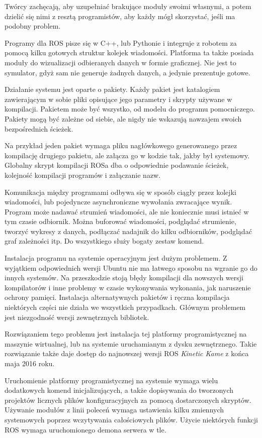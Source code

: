 Twórcy zachęcają, aby uzupełniać brakujące moduły swoimi własnymi, a potem dzielić się nimi z resztą programistów, aby każdy mógł skorzystać, jeśli ma podobny problem.

Programy dla ROS pisze się w C++, lub Pythonie i integruje z robotem za pomocą kilku gotowych struktur kolejek wiadomości.
Platforma ta także posiada moduły do wizualizacji odbieranych danych w formie graficznej.
Nie jest to symulator, gdyż sam nie generuje żadnych danych, a jedynie prezentuje gotowe.

Działanie systemu jest oparte o pakiety. Każdy pakiet jest katalogiem zawierającym w sobie pliki opisujące jego parametry i skrypty używane w kompilacji.
Pakietem może być wszystko, od modelu do programu pomocniczego.
Pakiety mogą być zależne od siebie, ale nigdy nie wskazują nawzajem swoich bezpośrednich ścieżek.

Na przykład jeden pakiet wymaga pliku nagłówkowego generowanego przez kompilację drugiego pakietu, ale załącza go w kodzie tak, jakby był systemowy.
Globalny skrypt kompilacji ROSa dba o odpowiednie podawanie ścieżek, kolejność kompilacji programów i załączanie nazw.

Komunikacja między programami odbywa się w sposób ciągły przez kolejki wiadomości, lub pojedyncze asynchroniczne wywołania zwracające wynik.
Program może nadawać strumień wiadomości, ale nie koniecznie musi istnieć w tym czasie odbiornik.
Można buforować wiadomości, podglądać strumienie, tworzyć wykresy z danych, podłączać nadajnik do kilku odbiorników, podglądać graf zależności itp.
Do wszystkiego służy bogaty zestaw komend.

Instalacja programu na systemie operacyjnym jest dużym problemem.
Z wyjątkiem odpowiednich wersji Ubuntu nie ma łatwego sposobu na wgranie go do innych systemów.
Na przeszkodzie stoją błędy kompilacji dla nowszych wersji kompilatorów i inne problemy w czasie wykonywania wykonania, jak naruszenie ochrony pamięci. 
Instalacja alternatywnych pakietów i ręczna kompilacja niektórych części nie działa we wszystkich przypadkach.
Głównym problemem jest niezgodność wersji zewnętrznych bibliotek.

Rozwiązaniem tego problemu jest instalacja tej platformy programistycznej na maszynie wirtualnej, lub na systemie uruchamianym z dysku zewnętrznego. 
Takie rozwiązanie także daje dostęp do najnowszej wersji ROS \emph{Kinetic Kame} z końca maja 2016 roku.

Uruchomienie platformy programistycznej na systemie wymaga wielu dodatkowych komend inicjalizujących, a także dopisywania do tworzonych projektów licznych plików konfiguracyjnych za pomocą dostarczonych skryptów.
Używanie modułów z linii poleceń wymaga ustawienia kilku zmiennych systemowych poprzez wczytywania całościowych plików.
Użycie niektórych funkcji ROS wymaga uruchomionego demona serwera w tle.

